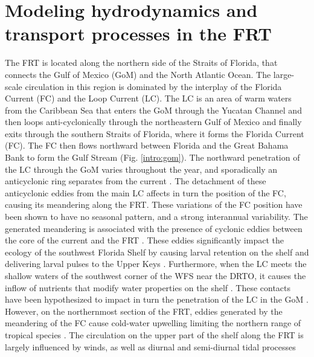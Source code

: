 \section{Modeling hydrodynamics and transport processes in the FRT}
The FRT is located along the northern side of the Straits of Florida, that connects the Gulf of Mexico (GoM) and the North Atlantic Ocean. The large-scale circulation in this region is dominated by the interplay of the Florida Current (FC) and the Loop Current (LC). The LC is an area of warm waters from the Caribbean Sea that enters the GoM through the Yucatan Channel and then loops anti-cyclonically through the northeastern Gulf of Mexico and finally exits through the southern Straits of Florida, where it forms the Florida Current (FC). The FC then flows northward between Florida and the Great Bahama Bank to form the Gulf Stream (Fig. \ref{intro:gom}). The northward penetration of the LC through the GoM varies throughout the year, and sporadically an anticyclonic ring separates from the current \citep{leipper1970sequence, maul1977annual, vukovich1988loop}. The detachment of these anticyclonic eddies from the main LC affects in turn the position of the FC, causing its meandering along the FRT. These variations of the FC position have been shown to have no seasonal pattern, and a strong interannual variability. The generated meandering is associated with the presence of cyclonic eddies between the core of the current and the FRT \citep{kourafalou2012florida}. These eddies significantly impact the ecology of the southwest Florida Shelf by causing larval retention on the shelf and delivering larval pulses to the Upper Keys \citep{lee1994evolution,limouzy1997translocation,sponaugle2005florida, kourafalou2012florida}. Furthermore, when the LC meets the shallow waters of the southwest corner of the WFS near the DRTO, it causes the inflow of nutrients that modify water properties on the shelf \citep{weisberg2003local, liu2016offshore}. These contacts have been hypothesized to impact in turn the penetration of the LC in the GoM \citep{weisberg2017loop}. However, on the northernmost section of the FRT, eddies generated by the meandering of the FC cause cold-water upwelling limiting the northern range of tropical species \citep{walker2013determining}. The circulation on the upper part of the shelf along the FRT is largely influenced by winds, as well as diurnal and semi-diurnal tidal processes \citep{lee2001transport, lee2002volume,d2007patterns}

